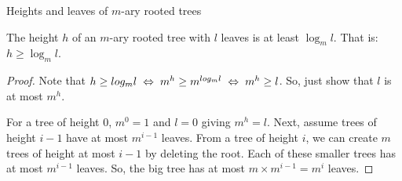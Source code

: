 \begin{frame}{Heights and leaves of $m$-ary rooted trees}
  \begin{theorem}
    The height $h$ of an $m$-ary rooted tree with $l$ leaves is at least $\log_m l$.
    That is: $h \geq \log_m l$.
  \end{theorem}
  \begin{proof}
    Note that $h \geq log_m l \hspace{0.1cm} \Leftrightarrow \hspace{0.1cm} m^h \geq m^{log_m l} \hspace{0.1cm} \Leftrightarrow \hspace{0.1cm} m^h \geq l$.
    So, just show that $l$ is at most $m^h$.
    
    For a tree of height 0, $m^0 = 1$ and $l=0$ giving $m^h = l$.
    Next, assume trees of height $i-1$ have at most $m^{i-1}$ leaves.
    From a tree of height $i$, we can create $m$ trees of height at most $i-1$ by deleting the root.
    Each of these smaller trees has at most $m^{i-1}$ leaves.
    So, the big tree has at most $m \times m^{i-1} = m^i$ leaves.
  \end{proof}
\end{frame}

